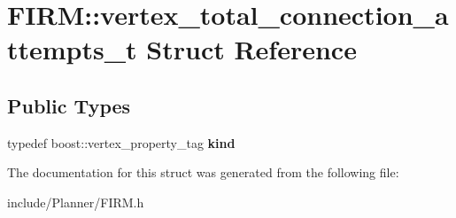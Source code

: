 \hypertarget{struct_f_i_r_m_1_1vertex__total__connection__attempts__t}{\section{\-F\-I\-R\-M\-:\-:vertex\-\_\-total\-\_\-connection\-\_\-attempts\-\_\-t \-Struct \-Reference}
\label{struct_f_i_r_m_1_1vertex__total__connection__attempts__t}
}
\subsection*{\-Public \-Types}
\begin{DoxyCompactItemize}
\item 
\hypertarget{struct_f_i_r_m_1_1vertex__total__connection__attempts__t_afb2aba317a24c9d5032e85713f69f8d0}{typedef boost\-::vertex\-\_\-property\-\_\-tag {\bfseries kind}}\label{struct_f_i_r_m_1_1vertex__total__connection__attempts__t_afb2aba317a24c9d5032e85713f69f8d0}

\end{DoxyCompactItemize}


\-The documentation for this struct was generated from the following file\-:\begin{DoxyCompactItemize}
\item 
include/\-Planner/\-F\-I\-R\-M.\-h\end{DoxyCompactItemize}
